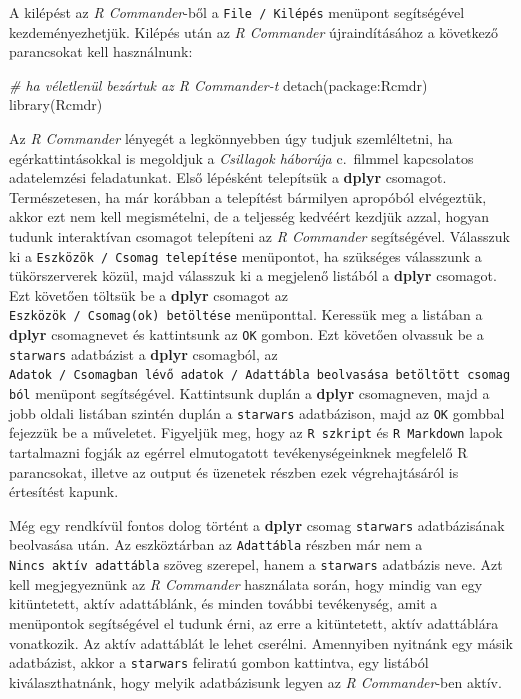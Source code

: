 \documentclass[
]{book}
\newenvironment{Shaded}{\begin{snugshade}}{\end{snugshade}}
\newcommand{\CommentTok}[1]{\textcolor[rgb]{0.56,0.35,0.01}{\textit{#1}}}
\newcommand{\FunctionTok}[1]{\textcolor[rgb]{0.00,0.00,0.00}{#1}}
\newcommand{\NormalTok}[1]{#1}
\newcommand{\SpecialCharTok}[1]{\textcolor[rgb]{0.00,0.00,0.00}{#1}}
\begin{document}
A kilépést az \emph{R Commander}-ből a \texttt{File\ /\ Kilépés} menüpont segítségével kezdeményezhetjük. Kilépés után az \emph{R Commander} újraindításához a következő parancsokat kell használnunk:

\begin{Shaded}
\begin{Highlighting}[]
\CommentTok{\# ha véletlenül bezártuk az R Commander{-}t}
\FunctionTok{detach}\NormalTok{(package}\SpecialCharTok{:}\NormalTok{Rcmdr)}
\FunctionTok{library}\NormalTok{(Rcmdr)}
\end{Highlighting}
\end{Shaded}

Az \emph{R Commander} lényegét a legkönnyebben úgy tudjuk szemléltetni, ha egérkattintásokkal is megoldjuk a \emph{Csillagok háborúja} c.~filmmel kapcsolatos adatelemzési feladatunkat. Első lépésként telepítsük a \textbf{dplyr} csomagot. Természetesen, ha már korábban a telepítést bármilyen apropóból elvégeztük, akkor ezt nem kell megismételni, de a teljesség kedvéért kezdjük azzal, hogyan tudunk interaktívan csomagot telepíteni az \emph{R Commander} segítségével. Válasszuk ki a \texttt{Eszközök\ /\ Csomag\ telepítése} menüpontot, ha szükséges válasszunk a tükörszerverek közül, majd válasszuk ki a megjelenő listából a \textbf{dplyr} csomagot. Ezt követően töltsük be a \textbf{dplyr} csomagot az \texttt{Eszközök\ /\ Csomag(ok)\ betöltése} menüponttal. Keressük meg a listában a \textbf{dplyr} csomagnevet és kattintsunk az \texttt{OK} gombon. Ezt követően olvassuk be a \texttt{starwars} adatbázist a \textbf{dplyr} csomagból, az \texttt{Adatok\ /\ Csomagban\ lévő\ adatok\ /\ Adattábla\ beolvasása\ betöltött\ csomagból} menüpont segítségével. Kattintsunk duplán a \textbf{dplyr} csomagneven, majd a jobb oldali listában szintén duplán a \texttt{starwars} adatbázison, majd az \texttt{OK} gombbal fejezzük be a műveletet. Figyeljük meg, hogy az \texttt{R\ szkript} és \texttt{R\ Markdown} lapok tartalmazni fogják az egérrel elmutogatott tevékenységeinknek megfelelő R parancsokat, illetve az output és üzenetek részben ezek végrehajtásáról is értesítést kapunk.

Még egy rendkívül fontos dolog történt a \textbf{dplyr} csomag \texttt{starwars} adatbázisának beolvasása után. Az eszköztárban az \texttt{Adattábla} részben már nem a \texttt{Nincs\ aktív\ adattábla} szöveg szerepel, hanem a \texttt{starwars} adatbázis neve. Azt kell megjegyeznünk az \emph{R Commander} használata során, hogy mindig van egy kitüntetett, aktív adattáblánk, és minden további tevékenység, amit a menüpontok segítségével el tudunk érni, az erre a kitüntetett, aktív adattáblára vonatkozik. Az aktív adattáblát le lehet cserélni. Amennyiben nyitnánk egy másik adatbázist, akkor a \texttt{starwars} feliratú gombon kattintva, egy listából kiválaszthatnánk, hogy melyik adatbázisunk legyen az \emph{R Commander}-ben aktív.
\end{document}
